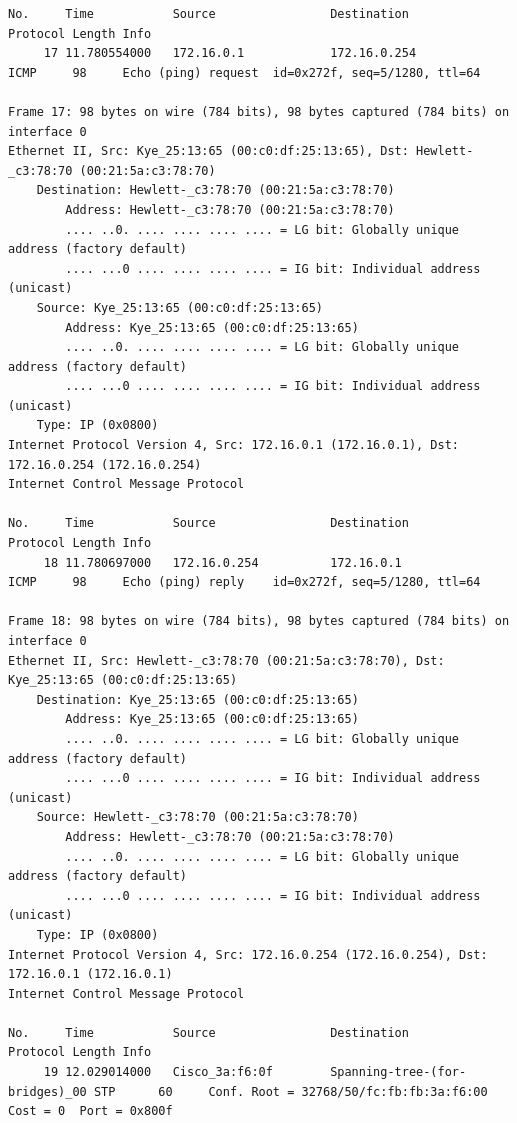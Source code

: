 \documentclass[a4paper,11pt]{article}
\begin{document}
\begin{lstlisting}
No.     Time           Source                Destination           Protocol Length Info
     17 11.780554000   172.16.0.1            172.16.0.254          ICMP     98     Echo (ping) request  id=0x272f, seq=5/1280, ttl=64

Frame 17: 98 bytes on wire (784 bits), 98 bytes captured (784 bits) on interface 0
Ethernet II, Src: Kye_25:13:65 (00:c0:df:25:13:65), Dst: Hewlett-_c3:78:70 (00:21:5a:c3:78:70)
    Destination: Hewlett-_c3:78:70 (00:21:5a:c3:78:70)
        Address: Hewlett-_c3:78:70 (00:21:5a:c3:78:70)
        .... ..0. .... .... .... .... = LG bit: Globally unique address (factory default)
        .... ...0 .... .... .... .... = IG bit: Individual address (unicast)
    Source: Kye_25:13:65 (00:c0:df:25:13:65)
        Address: Kye_25:13:65 (00:c0:df:25:13:65)
        .... ..0. .... .... .... .... = LG bit: Globally unique address (factory default)
        .... ...0 .... .... .... .... = IG bit: Individual address (unicast)
    Type: IP (0x0800)
Internet Protocol Version 4, Src: 172.16.0.1 (172.16.0.1), Dst: 172.16.0.254 (172.16.0.254)
Internet Control Message Protocol

No.     Time           Source                Destination           Protocol Length Info
     18 11.780697000   172.16.0.254          172.16.0.1            ICMP     98     Echo (ping) reply    id=0x272f, seq=5/1280, ttl=64

Frame 18: 98 bytes on wire (784 bits), 98 bytes captured (784 bits) on interface 0
Ethernet II, Src: Hewlett-_c3:78:70 (00:21:5a:c3:78:70), Dst: Kye_25:13:65 (00:c0:df:25:13:65)
    Destination: Kye_25:13:65 (00:c0:df:25:13:65)
        Address: Kye_25:13:65 (00:c0:df:25:13:65)
        .... ..0. .... .... .... .... = LG bit: Globally unique address (factory default)
        .... ...0 .... .... .... .... = IG bit: Individual address (unicast)
    Source: Hewlett-_c3:78:70 (00:21:5a:c3:78:70)
        Address: Hewlett-_c3:78:70 (00:21:5a:c3:78:70)
        .... ..0. .... .... .... .... = LG bit: Globally unique address (factory default)
        .... ...0 .... .... .... .... = IG bit: Individual address (unicast)
    Type: IP (0x0800)
Internet Protocol Version 4, Src: 172.16.0.254 (172.16.0.254), Dst: 172.16.0.1 (172.16.0.1)
Internet Control Message Protocol

No.     Time           Source                Destination           Protocol Length Info
     19 12.029014000   Cisco_3a:f6:0f        Spanning-tree-(for-bridges)_00 STP      60     Conf. Root = 32768/50/fc:fb:fb:3a:f6:00  Cost = 0  Port = 0x800f


\end{lstlisting}
\end{document}
